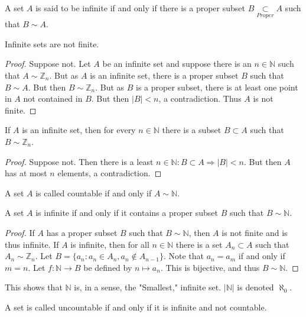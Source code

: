     \begin{definition}
    A set $A$ is said to be infinite if and only if there is a proper subset $B\underset{Proper}\subset A$ such that $B\sim A$.
    \end{definition}
    \begin{theorem}
    Infinite sets are not finite.
    \end{theorem}
    \begin{proof}
    Suppose not. Let $A$ be an infinite set and suppose there is an $n\in \mathbb{N}$ such
    that $A\sim \mathbb{Z}_n$. But as $A$ is an infinite set, there is a proper subset $B$
    such that $B\sim A$. But then $B\sim \mathbb{Z}_n$. But as $B$ is a proper subset,
    there is at least one point in $A$ not contained in $B$. But then $|B|<n$, a contradiction. Thus $A$ is not finite.
    \end{proof}
    \begin{theorem}
        If $A$ is an infinite set, then for every $n\in \mathbb{N}$
        there is a subset $B\subset A$ such that $B\sim \mathbb{Z}_n$.
    \end{theorem}
    \begin{proof}
    Suppose not. Then there is a least $n\in \mathbb{N}:B\subset A\Rightarrow |B|<n$.
    But then $A$ has at most $n$ elements, a contradiction.
    \end{proof}
    \begin{definition}
        A set $A$ is called countable if and only if $A\sim \mathbb{N}$.
    \end{definition}
    \begin{theorem}
    A set $A$ is infinite if and only if it contains a proper subset $B$ such that $B\sim \mathbb{N}$.
    \end{theorem}
    \begin{proof}
    If $A$ has a proper subset $B$ such that $B\sim \mathbb{N}$, then $A$ is not finite and is thus infinite.
    If $A$ is infinite, then for all $n\in \mathbb{N}$ there is a set $A_n\subset A$ such that
    $A_n \sim \mathbb{Z}_n$. Let $B = \{a_n: a_n \in A_n, a_n \notin A_{n-1}\}$.
    Note that $a_{n} = a_{m}$ if and only if $m= n$. Let $f:\mathbb{N} \rightarrow B$
    be defined by $n\mapsto a_n$. This is bijective, and thus $B\sim \mathbb{N}$.
    \end{proof}
    This shows that $\mathbb{N}$ is, in a sense, the "Smallest,"
    infinite set. $|\mathbb{N}|$ is denoted $\aleph_0$.
    \begin{definition}
    A set is called uncountable if and only if it is infinite and not countable.
    \end{definition}
